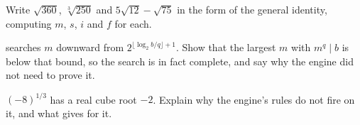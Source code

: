 \begin{exercisebox}[By hand]
  Write $\sqrt{360}$, $\sqrt[3]{250}$ and $5\sqrt{12} - \sqrt{75}$ in the form of the general
  identity, computing $m$, $s$, $i$ and $f$ for each.
\end{exercisebox}

\begin{exercisebox}[Completeness]
   searches $m$ downward from $2^{\lfloor \log_2 b / q \rfloor + 1}$. Show that
  the largest $m$ with $m^q \mid b$ is below that bound, so the search is in fact complete, and
  say why the engine did not need to prove it.
\end{exercisebox}

\begin{exercisebox}
  $(-8)^{1/3}$ has a real cube root $-2$. Explain why the engine's rules do not fire on it, and
  what  gives for it.
\end{exercisebox}
